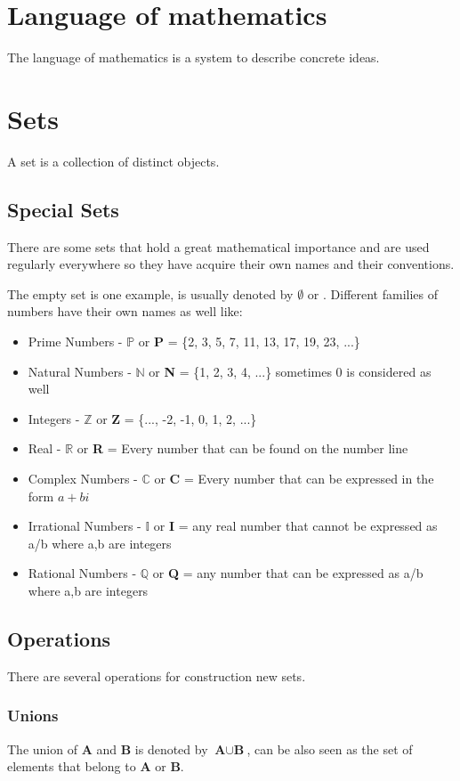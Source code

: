 \documentclass[a4paper,11pt]{book}
\begin{document}
\raggedright
\section{Language of mathematics}

The language of mathematics is a system to describe concrete ideas.
\section{Sets}
A set is a collection of distinct objects.
\subsection{Special Sets}
There are some sets that hold a great mathematical importance and are used regularly everywhere so they have acquire their own names and their conventions.

The empty set is one example, is usually denoted by $\emptyset$ or {}.
Different families of numbers have their own names as well like:
\begin{itemize}
	\item Prime Numbers - $\mathbb{P}$ or \textbf{P} = \{2, 3, 5, 7, 11, 13, 17, 19, 23, ...\}
	\item Natural Numbers - $\mathbb{N}$ or \textbf{N} = \{1, 2, 3, 4, ...\} sometimes 0 is considered as well
	\item Integers - $\mathbb{Z}$ or \textbf{Z} = \{..., -2, -1, 0, 1, 2, ...\}
	\item Real - $\mathbb{R}$ or \textbf{R} = Every number that can be found on the number line
	\item Complex Numbers - $\mathbb{C}$ or \textbf{C} = Every number that can be expressed in the form $a+bi$
	\item Irrational Numbers - $\mathbb{I}$ or \textbf{I} = any real number that cannot be expressed as a/b where a,b are integers
	\item Rational Numbers - $\mathbb{Q}$ or \textbf{Q} = any number that can be expressed as a/b where a,b are integers
\end{itemize}
\subsection{Operations}
There are several operations for construction new sets.
\subsubsection{Unions}
The union of \textbf{A} and \textbf{B} is denoted by $\textbf{A} \cup \textbf{B}$, can be also seen as the set of elements that belong to \textbf{A} or \textbf{B}.
\end{document}
